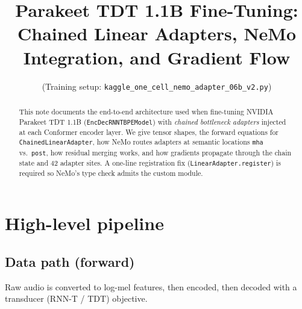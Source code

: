 \documentclass[11pt,a4paper]{article}
\title{Parakeet TDT 1.1B Fine-Tuning:\\
Chained Linear Adapters, NeMo Integration, and Gradient Flow}
\author{(Training setup: \texttt{kaggle\_one\_cell\_nemo\_adapter\_06b\_v2.py})}
\date{}
\begin{document}
\maketitle

\begin{abstract}
This note documents the end-to-end architecture used when fine-tuning NVIDIA Parakeet TDT 1.1B (\texttt{EncDecRNNTBPEModel}) with \emph{chained bottleneck adapters} injected at each Conformer encoder layer. We give tensor shapes, the forward equations for \texttt{ChainedLinearAdapter}, how NeMo routes adapters at semantic locations \texttt{mha} vs.\ \texttt{post}, how residual merging works, and how gradients propagate through the chain state and 42 adapter sites. A one-line registration fix (\texttt{LinearAdapter.register}) is required so NeMo's type check admits the custom module.
\end{abstract}

\tableofcontents
\newpage

\section{High-level pipeline}

\subsection{Data path (forward)}
Raw audio is converted to log-mel features, then encoded, then decoded with a transducer (RNN-T / TDT) objective.

\begin{center}
\end{center}
\end{document}
